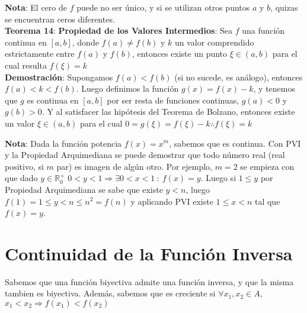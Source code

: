 \documentclass[11pt,a4paper]{article}
\begin{document}
\textbf{Nota}: El cero de $f$ puede no ser \'unico, y si se utilizan otros puntos $a$ y $b$, quizas se encuentran ceros diferentes.\\

\noindent \textbf{Teorema 14}: \textbf{Propiedad de los Valores Intermedios}: Sea $f$ una funci\'on continua en $[a,b]$, donde $f(a) \not = f(b)$ y $k$ un valor comprendido estrictamente entre $f(a)$ y $f(b)$, entonces existe un punto $\xi \in (a,b)$ para el cual resulta $f(\xi)=k$\\
\noindent \textbf{Demostraci\'on}: Supongamos $f(a)<f(b)$ (si no sucede, es an\'alogo), entonces $f(a)<k<f(b)$. Luego definimos la funci\'on $g(x) = f(x)-k$, y tenemos que $g$ es continua en $[a,b]$ por ser resta de funciones continuas, $g(a)<0$ y $g(b)>0$. Y al satisfacer las hip\'otesis del Teorema de Bolzano, entonces existe un valor $\xi \in (a,b)$ para el cual $0=g(\xi) = f(\xi)-k \therefore f(\xi)=k$

\textbf{Nota}: Dada la funci\'on potencia $f(x)=x^m$, sabemos que es continua. Con PVI y la Propiedad Arquimediana se puede demostrar que todo n\'umero real (real positivo, si $m$ par) es imagen de alg\'un otro. Por ejemplo, $m=2$ se empieza con que dado $y\in \mathbb{R}^+_0$ $0<y<1 \Rightarrow \exists 0<x<1\ :\ f(x)=y$. Luego si $1\leq y$ por Propiedad Arquimediana se sabe que existe $y<n$, luego $f(1)=1\leq y<n\leq n^2 = f(n)$ y aplicando PVI existe $1\leq x < n$ tal que $f(x)=y$.

\section{Continuidad de la Funci\'on Inversa}
Sabemos que una funci\'on biyectiva admite una funci\'on inversa, y que la misma tambien es biyectiva. Adem\'as, sabemos que es creciente si $\forall x_1, x_2 \in A$, $x_1 < x_2 \Rightarrow f(x_1) < f(x_2)$\\
\end{document}
